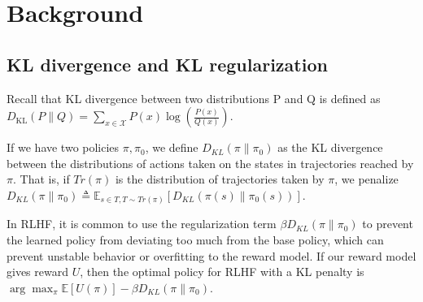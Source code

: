 \documentclass{article}
\theoremstyle{plain}
\theoremstyle{definition}
\theoremstyle{remark}
\begin{document}






\section{Background}

\subsection{KL divergence and KL regularization}

Recall that KL divergence between two distributions P and Q is defined as \(
D_{\mathrm{KL}}(P \| Q)=\sum_{x \in \mathcal{X}} P(x) \log \left(\frac{P(x)}{Q(x)}\right)
\).

If we have two policies $\pi, \pi_0$, we define $D_{KL}(\pi \| \pi_0)$ as the KL divergence between the distributions of actions taken on the states in trajectories reached by $\pi$. That is, if $Tr(\pi)$ is the distribution of trajectories taken by $\pi$, we penalize
\(D_{KL}(\pi \| \pi_0) \triangleq \mathbb E_{s \in T, T\sim Tr(\pi)}[D_{KL}(\pi(s) \| \pi_0(s))]\).

In RLHF, it is common to use the regularization term $\beta D_{KL}\left(\pi \| \pi_0 \right)$ to prevent the learned policy from deviating too much from the base policy, which can prevent unstable behavior or overfitting to the reward model. If our reward model gives reward $U$, then the optimal policy for RLHF with a KL penalty is $
\arg \max_{\pi} \mathbb{E} [U(\pi)]-\beta D_{KL}\left(\pi \| \pi_0 \right).
$
\end{document}
